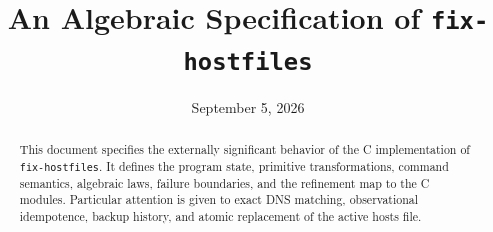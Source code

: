 \documentclass[11pt]{article}
\title{An Algebraic Specification of \texttt{fix-hostfiles}}
\author{}
\date{September 5, 2026}
\begin{document}
\maketitle
\begin{abstract}
This document specifies the externally significant behavior of the C
implementation of \texttt{fix-hostfiles}.  It defines the program state,
primitive transformations, command semantics, algebraic laws, failure
boundaries, and the refinement map to the C modules.  Particular attention is
given to exact DNS matching, observational idempotence, backup history, and
atomic replacement of the active hosts file.
\end{abstract}

\tableofcontents











\end{document}
